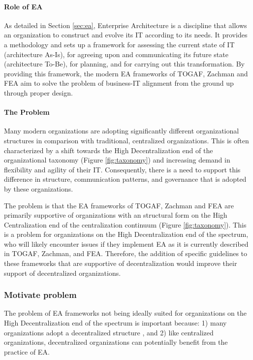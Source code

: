 \paragraph*{Role of EA}

As detailed in Section \ref{sec:ea}, Enterprise Architecture is a discipline that allows an organization to construct and evolve its IT according to its needs. It provides a methodology and sets up a framework for assessing the current state of IT (architecture As-Is), for agreeing upon and communicating its future state (architecture To-Be), for planning, and for carrying out this transformation. By providing this framework, the modern EA frameworks of TOGAF, Zachman and FEA aim to solve the problem of business-IT alignment from the ground up through proper design. 

\paragraph*{The Problem} 

Many modern organizations are adopting significantly different organizational structures in comparison with traditional, centralized organizations. This is often characterized by a shift towards the High Decentralization end of the organizational taxonomy (Figure \ref{fig:taxonomy}) and increasing demand in flexibility and agility of their IT. Consequently, there is a need to support this difference in structure, communication patterns, and governance that is adopted by these organizations.

The problem is that the EA frameworks of TOGAF, Zachman and FEA are primarily supportive of organizations with an structural form on the High Centralization end of the centralization continuum (Figure \ref{fig:taxonomy}). This is a problem for organizations on the High Decentralization end of the spectrum, who will likely encounter issues if they implement EA as it is currently described in TOGAF, Zachman, and FEA. Therefore, the addition of specific guidelines to these frameworks that are supportive of decentralization would improve their support of decentralized organizations.

\subsubsection{Motivate problem} 

The problem of EA frameworks not being ideally suited for organizations on the High Decentralization end of the spectrum is important because: 1) many organizations adopt a decentralized structure \cite{acemoglu2007technology,fulk1995}, and 2) like centralized organizations, decentralized organizations can potentially benefit from the practice of EA.

